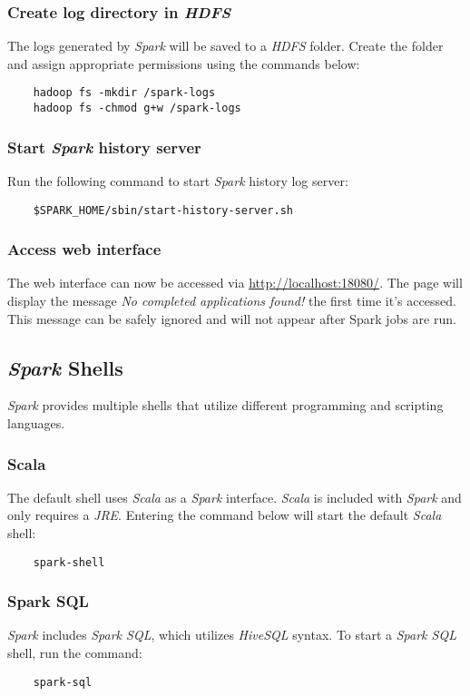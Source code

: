 \documentclass{article}
\begin{document}
    \subsubsection{Create log directory in \emph{HDFS}}
    The logs generated by \emph{Spark} will be saved to a \emph{HDFS} folder. Create the folder
    and assign appropriate permissions using the commands below:
    \begin{verbatim}
    hadoop fs -mkdir /spark-logs
    hadoop fs -chmod g+w /spark-logs
    \end{verbatim}

    \subsubsection{Start \emph{Spark} history server}
    \label{subsec:sparklog}
    Run the following command to start \emph{Spark} history log server:
    \begin{verbatim}
    $SPARK_HOME/sbin/start-history-server.sh
    \end{verbatim}

    \subsubsection{Access web interface}
    The web interface can now be accessed via \url{http://localhost:18080/}. The page will
    display the message \emph{No completed applications found!} the first time it's accessed.
    This message can be safely ignored and will not appear after Spark jobs are run.

  \subsection{\emph{Spark} Shells}
  \emph{Spark} provides multiple shells that utilize different programming and scripting languages.

    \subsubsection{Scala}
    The default shell uses \emph{Scala} as a \emph{Spark} interface. \emph{Scala} is included
    with \emph{Spark} and only requires a \emph{JRE}. Entering the command below will start
    the default \emph{Scala} shell:
    \begin{verbatim}
    spark-shell
    \end{verbatim}

    \subsubsection{Spark SQL}
    \emph{Spark} includes \emph{Spark SQL}, which utilizes \emph{HiveSQL} syntax. To start
    a \emph{Spark SQL} shell, run the command:
    \begin{verbatim}
    spark-sql
    \end{verbatim}
\end{document}
